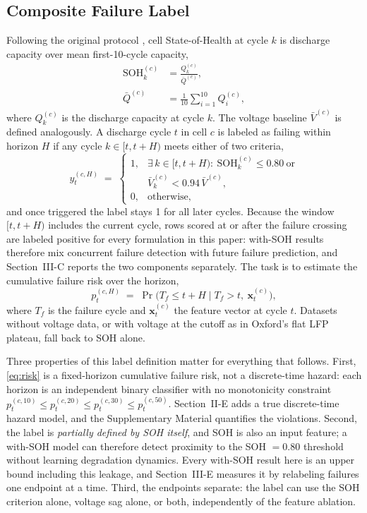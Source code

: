 \documentclass[11pt,a4paper]{article}
\begin{document}
\subsection{Composite Failure Label}
Following the original protocol \cite{shikdar2026learning}, cell State-of-Health at cycle $k$ is discharge capacity over mean first-10-cycle capacity,
\begin{equation}\label{eq:soh}
\begin{aligned}
\mathrm{SOH}_k^{(c)} &= \frac{Q_k^{(c)}}{\bar{Q}^{(c)}},\\[2pt]
\bar{Q}^{(c)} &= \frac{1}{10}\sum_{i=1}^{10} Q_i^{(c)},
\end{aligned}
\end{equation}
where $Q_k^{(c)}$ is the discharge capacity at cycle $k$. The voltage baseline $\bar{V}^{(c)}$ is defined analogously. A discharge cycle $t$ in cell $c$ is labeled as failing within horizon $H$ if any cycle $k\in[t,t{+}H)$ meets either of two criteria,
\begin{equation}\label{eq:label}
y_t^{(c,H)} \;=\; \begin{cases}
1, & \exists\, k\in[t,t{+}H):\ \mathrm{SOH}_k^{(c)}\le 0.80 \ \text{or}\\[2pt]
& \bar{V}_k^{(c)} < 0.94\,\bar{V}^{(c)},\\[2pt]
0, & \text{otherwise,}
\end{cases}
\end{equation}
and once triggered the label stays 1 for all later cycles. Because the window $[t,t{+}H)$ includes the current cycle, rows scored at or after the failure crossing are labeled positive for every formulation in this paper: with-SOH results therefore mix concurrent failure detection with future failure prediction, and Section~III-C reports the two components separately. The task is to estimate the cumulative failure risk over the horizon,
\begin{equation}\label{eq:risk}
p_t^{(c,H)} \;=\; \Pr\!\bigl(T_f \le t{+}H \mid T_f > t,\ \mathbf{x}_t^{(c)}\bigr),
\end{equation}
where $T_f$ is the failure cycle and $\mathbf{x}_t^{(c)}$ the feature vector at cycle $t$. Datasets without voltage data, or with voltage at the cutoff as in Oxford's flat LFP plateau, fall back to SOH alone.

Three properties of this label definition matter for everything that follows. First, \eqref{eq:risk} is a fixed-horizon cumulative failure risk, not a discrete-time hazard: each horizon is an independent binary classifier with no monotonicity constraint $p_t^{(c,10)}\le p_t^{(c,20)}\le p_t^{(c,30)}\le p_t^{(c,50)}$. Section~II-E adds a true discrete-time hazard model, and the Supplementary Material quantifies the violations. Second, the label is \emph{partially defined by SOH itself}, and SOH is also an input feature; a with-SOH model can therefore detect proximity to the SOH $=0.80$ threshold without learning degradation dynamics. Every with-SOH result here is an upper bound including this leakage, and Section~III-E measures it by relabeling failures one endpoint at a time. Third, the endpoints separate: the label can use the SOH criterion alone, voltage sag alone, or both, independently of the feature ablation.
\end{document}
